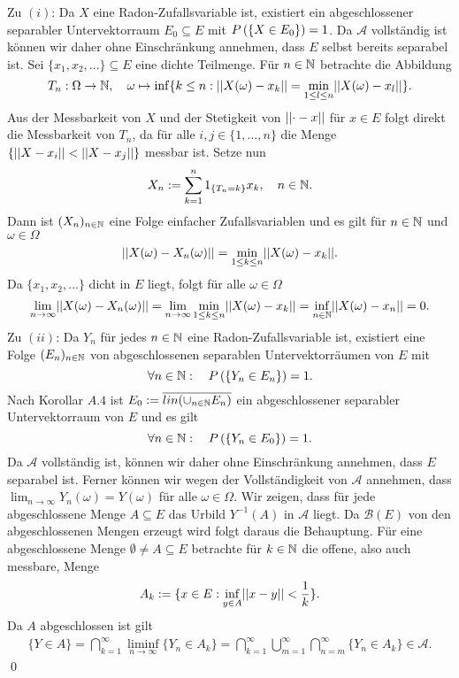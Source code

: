 \begin{proof*}
    Zu $(i)$:
    Da $X$ eine Radon-Zufallsvariable ist, existiert ein abgeschlossener separabler Untervektorraum $E_0 \subseteq E$ mit $P\left(\left\{ X \in E_0 \right\}\right) = 1$. 
    Da $\mathcal{A}$ vollständig ist können wir daher ohne Einschränkung annehmen, dass $E$ selbst bereits separabel ist. 
    Sei $\{x_1,x_2,... \} \subseteq E$ eine dichte Teilmenge. Für $n \in \mathbb{N}$ betrachte die Abbildung
    $$
        T_n: \Omega \to \mathbb{N}, \quad \omega \mapsto \inf\{k \leq n: \lvert\lvert X(\omega)-x_k \rvert\rvert = \min_{1\leq l \leq n}\lvert\lvert X(\omega)-x_l \rvert\rvert\}.
    $$ 
    Aus der Messbarkeit von $X$ und der Stetigkeit von $\lvert\lvert \cdot - x \rvert\rvert$ für $x \in E$ folgt direkt die Messbarkeit von $T_n$,
    da für alle $i,j \in \{1,...,n\}$ die Menge $\{\lvert\lvert X - x_i \rvert\rvert < \lvert\lvert X - x_j \rvert\rvert\}$ messbar ist. Setze nun
    $$
        X_n := \sum_{k=1}^n 1_{\{T_n = k\}}x_k, \quad n \in \mathbb{N}.
    $$
    Dann ist $(X_n)_{n \in \mathbb{N}}$ eine Folge einfacher Zufallsvariablen und es gilt für $n \in \mathbb{N}$ und $\omega \in \Omega$
    $$
        \lvert\lvert X(\omega)-X_n(\omega) \rvert\rvert = \min_{1\leq k \leq n}\lvert\lvert X(\omega)-x_k \rvert\rvert.
    $$
    Da $\{x_1,x_2,...\}$ dicht in $E$ liegt, folgt für alle $\omega \in \Omega$
    $$
        \lim_{n \to \infty}\lvert\lvert X(\omega) - X_n(\omega) \rvert\rvert = \lim_{n \to \infty}\min_{1\leq k \leq n}\lvert\lvert X(\omega)- x_k \rvert\rvert = \inf_{n \in \mathbb{N}} \lvert\lvert X(\omega)- x_n \rvert\rvert = 0. 
    $$
    Zu $(ii)$: Da $Y_n$ für jedes $n \in \mathbb{N}$ eine Radon-Zufallsvariable ist, existiert eine Folge $(E_n)_{n \in \mathbb{N}}$ von abgeschlossenen separablen Untervektorräumen von $E$ mit 
    $$
        \forall n \in \mathbb{N}: \quad P\left(\left\{ Y_n \in E_n \right\}\right) = 1. 
    $$
    Nach Korollar $A.4$ ist $E_0 := \overline{lin(\cup_{n \in \mathbb{N}}E_n)}$ ein abgeschlossener separabler Untervektorraum von $E$ und es gilt  
    $$
        \forall n \in \mathbb{N}: \quad P\left(\left\{ Y_n \in E_0 \right\}\right) = 1. 
    $$
    Da $\mathcal{A}$ vollständig ist, können wir daher ohne Einschränkung annehmen, dass $E$ separabel ist. 
    Ferner können wir wegen der Vollständigkeit von $\mathcal{A}$ annehmen, dass $\lim_{n \to \infty} Y_n(\omega) = Y(\omega)$ für alle $\omega \in \Omega$. 
    Wir zeigen, dass für jede abgeschlossene Menge $A \subseteq E$ das Urbild $Y^{-1}(A)$ in $\mathcal{A}$ liegt. 
    Da $\mathcal{B}(E)$ von den abgeschlossenen Mengen erzeugt wird folgt daraus die Behauptung. 
    Für eine abgeschlossene Menge $\emptyset \neq A \subseteq E$ betrachte für $k \in \mathbb{N}$ die offene, also auch messbare, Menge 
    $$
        A_k := \{x \in E: \inf_{y\in A}\lvert\lvert x-y \rvert\rvert < \frac{1}{k}\}.
    $$
    Da $A$ abgeschlossen ist gilt 
    \begin{align*}
        \{Y \in A\} = \bigcap_{k=1}^{\infty}\liminf_{n \to \infty}\{Y_n \in A_k\} = \bigcap_{k=1}^{\infty}\bigcup_{m=1}^{\infty}\bigcap_{n=m}^{\infty}\{Y_n \in A_k\}\in \mathcal{A}.
    \end{align*}     
    \qed 
\end{proof*}

